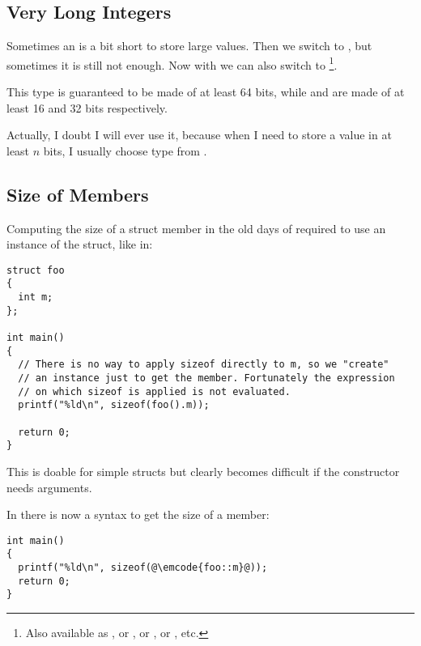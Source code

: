 \subsection{Very Long Integers}

Sometimes an  is a bit short to store large values. Then we
switch to , but sometimes it is still not enough. Now
with  we can also switch to \footnote{Also
available as , or ,
or , or , etc.}.

This type is guaranteed to be made of at least 64 bits,
while  and  are made of at least 16 and 32
bits respectively.

Actually, I doubt I will ever use it, because when I need to store a
value in at least $n$ bits, I usually choose  type
from .

\subsection{Size of Members}

Computing the size of a struct member in the old days of \cpp{}
required to use an instance of the struct, like in:

\begin{lstlisting}
struct foo
{
  int m;
};

int main()
{
  // There is no way to apply sizeof directly to m, so we "create"
  // an instance just to get the member. Fortunately the expression
  // on which sizeof is applied is not evaluated.
  printf("%ld\n", sizeof(foo().m));

  return 0;
}
\end{lstlisting}

This is doable for simple structs but clearly becomes difficult if
the constructor needs arguments.

In  there is now a syntax to get the size of a member:

\begin{lstlisting}
int main()
{
  printf("%ld\n", sizeof(@\emcode{foo::m}@));
  return 0;
}
\end{lstlisting}

